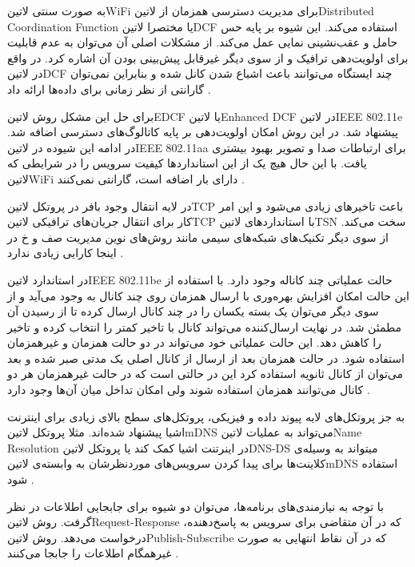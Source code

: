 به صورت سنتی ‌لاتین{WiFi} برای مدیریت دسترسی همزمان از ‌لاتین{Distributed Coordination Function} یا مختصرا ‌لاتین{DCF} استفاده می‌کند.
این شیوه بر پایه حس حامل و عقب‌نشینی نمایی عمل می‌کند. از مشکلات اصلی آن می‌توان به عدم قابلیت برای اولویت‌دهی ترافیک و از سوی دیگر غیرقابل پیش‌بینی بودن
آن اشاره کرد. در واقع در ‌لاتین{DCF} چند ایستگاه می‌توانند باعث اشباع شدن کانل شده و بنابراین نمی‌توان گارانتی از نظر زمانی برای داده‌ها ارائه داد
.

برای حل این مشکل روش ‌لاتین{EDCF} یا ‌لاتین{Enhanced DCF} در ‌لاتین{IEEE 802.11e} پیشنهاد شد. در این روش امکان اولویت‌دهی بر پایه
کاتالوگ‌های دسترسی اضافه شد. در ادامه این شیوده در ‌لاتین{IEEE 802.11aa} برای ارتباطات صدا و تصویر بهبود بیشتری یافت.
با این حال هیچ یک از این استانداردها کیفیت سرویس را در شرایطی که ‌لاتین{WiFi} دارای بار اضافه است، گارانتی نمی‌کنند
.

در لایه انتقال وجود بافر در پروتکل ‌لاتین{TCP} باعث تاخیرهای زیادی می‌شود و این امر کار برای انتقال جریان‌های ترافیکی ‌لاتین{TCP}
با استانداردهای ‌لاتین{TSN} سخت می‌کند. از سوی دیگر تکنیک‌های شبکه‌های سیمی مانند روش‌های نوین مدیریت صف و ‌خ در اینجا
کارایی زیادی ندارد
.

در استاندارد ‌لاتین{IEEE 802.11be} حالت عملیاتی چند کاناله وجود دارد. با استفاده از این حالت امکان افزایش بهره‌وری با ارسال همزمان
روی چند کانال به وجود می‌آید و از سوی دیگر می‌توان یک بسته یکسان را در چند کانال ارسال کرده تا از رسیدن آن مطمئن شد. در نهایت ارسال‌کننده
می‌تواند کانال با تاخیر کمتر را انتخاب کرده و تاخیر را کاهش دهد. این حالت عملیاتی خود می‌تواند در دو حالت همزمان و غیرهمزمان استفاده شود.
در حالت همزمان بعد از ارسال از کانال اصلی یک مدتی صبر شده و بعد می‌توان از کانال ثانویه استفاده کرد این در حالتی است که در حالت غیرهمزمان
هر دو کانال می‌توانند همزمان استفاده شوند ولی امکان تداخل میان آن‌ها وجود دارد
.



به جز پروتکل‌های لایه پیوند داده و فیزیکی، پروتکل‌های سطح بالای زیادی برای اینترنت اشیا پیشنهاد شده‌اند.
مثلا پروتکل ‌لاتین{mDNS} می‌تواند به عملیات ‌لاتین{Name Resolution} در اینرتنت اشیا کمک کند یا پروتکل
‌لاتین{DNS-DS} میتواند به وسیله‌ی کلاینت‌ها برای پیدا کردن سرویس‌های موردنظرشان به وابسته‌ی ‌لاتین{mDNS} استفاده شود
.

با توجه به نیازمندی‌های برنامه‌ها، می‌توان دو شیوه برای جابجایی اطلاعات در نظر گرفت. روش ‌لاتین{Request-Response}
که در آن متقاضی برای سرویس به پاسخ‌دهنده، درخواست می‌دهد.
روش ‌لاتین{Publish-Subscribe} که در آن نقاط انتهایی به صورت غیرهمگام اطلاعات را جابجا می‌کنند
.

